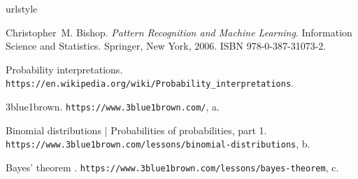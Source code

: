 \documentclass{../template/texnote}
\begin{document}

 \nocite{wikipedia}
 \nocite{3b1b_binomial}
 \nocite{3b1b_bayes}



\begin{thebibliography}{1}
\providecommand{\natexlab}[1]{#1}
\providecommand{\url}[1]{\texttt{#1}}
\expandafter\ifx\csname urlstyle\endcsname\relax
  \providecommand{\doi}[1]{doi: #1}\else
  \providecommand{\doi}{doi: \begingroup \urlstyle{rm}\Url}\fi

Christopher~M. Bishop.
\newblock \emph{Pattern Recognition and Machine Learning}.
\newblock Information Science and Statistics. {Springer}, {New York}, 2006.
\newblock ISBN 978-0-387-31073-2.

{Probability interpretations}.
\newblock \url{https://en.wikipedia.org/wiki/Probability_interpretations}.

{ 3blue1brown}.
\newblock \url{https://www.3blue1brown.com/}, {\natexlab{a}}.

{ Binomial distributions | Probabilities of probabilities, part 1}.
\newblock \url{https://www.3blue1brown.com/lessons/binomial-distributions},
  {\natexlab{b}}.

{ Bayes' theorem }.
\newblock \url{https://www.3blue1brown.com/lessons/bayes-theorem},
  {\natexlab{c}}.

\end{thebibliography}
\vspace{0.5cm}
\noindent{}
    \printbibliography
\end{document}
